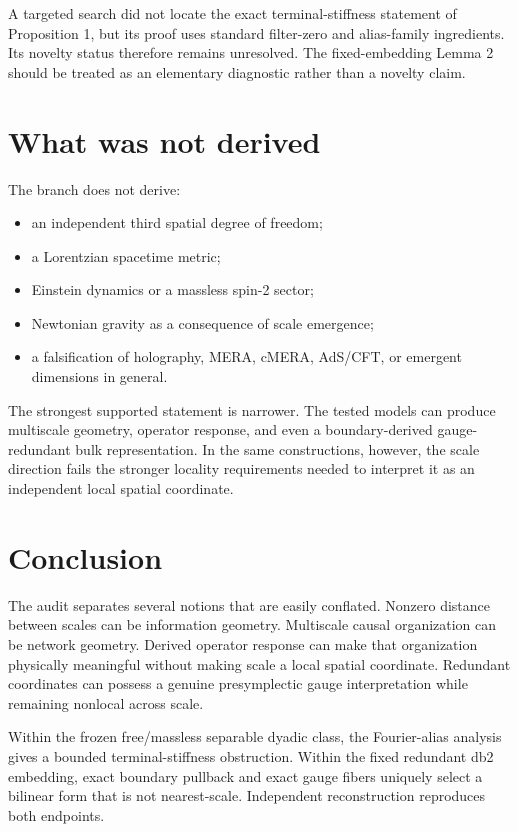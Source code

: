 \documentclass[11pt,a4paper]{article}
\begin{document}
A targeted search did not locate the exact terminal-stiffness statement of Proposition 1, but its proof uses standard filter-zero and alias-family ingredients. Its novelty status therefore remains unresolved. The fixed-embedding Lemma 2 should be treated as an elementary diagnostic rather than a novelty claim.

\section{What was not derived}
The branch does not derive:
\begin{itemize}
\item an independent third spatial degree of freedom;
\item a Lorentzian spacetime metric;
\item Einstein dynamics or a massless spin-2 sector;
\item Newtonian gravity as a consequence of scale emergence;
\item a falsification of holography, MERA, cMERA, AdS/CFT, or emergent dimensions in general.
\end{itemize}

The strongest supported statement is narrower. The tested models can produce multiscale geometry, operator response, and even a boundary-derived gauge-redundant bulk representation. In the same constructions, however, the scale direction fails the stronger locality requirements needed to interpret it as an independent local spatial coordinate.

\section{Conclusion}
The audit separates several notions that are easily conflated. Nonzero distance between scales can be information geometry. Multiscale causal organization can be network geometry. Derived operator response can make that organization physically meaningful without making scale a local spatial coordinate. Redundant coordinates can possess a genuine presymplectic gauge interpretation while remaining nonlocal across scale.

Within the frozen free/massless separable dyadic class, the Fourier-alias analysis gives a bounded terminal-stiffness obstruction. Within the fixed redundant db2 embedding, exact boundary pullback and exact gauge fibers uniquely select a bilinear form that is not nearest-scale. Independent reconstruction reproduces both endpoints.
\end{document}
